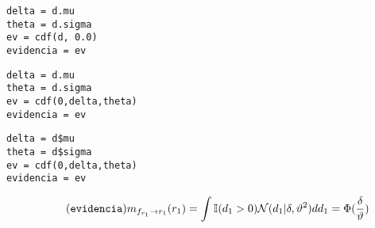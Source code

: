 \documentclass[article]{jss}
\newcommand{\N}{\mathcal{N}}
\begin{document}
\begin{paracol}{3}
\begin{lstlisting}[backgroundcolor=\color{julia}]
delta = d.mu
theta = d.sigma
ev = cdf(d, 0.0)
evidencia = ev
\end{lstlisting}  
 \switchcolumn
\begin{lstlisting}[backgroundcolor=\color{python}]
delta = d.mu
theta = d.sigma
ev = cdf(0,delta,theta) 
evidencia = ev
\end{lstlisting} 
 \switchcolumn
\begin{lstlisting}[backgroundcolor=\color{r}]
delta = d$mu
theta = d$sigma
ev = cdf(0,delta,theta) 
evidencia = ev
\end{lstlisting}   
\end{paracol}
%
\begin{equation}\label{eq:m_fr_r} \tag{\texttt{evidencia}}
\begin{split}
 m_{f_{r_1} \rightarrow r_1}(r_1) = \int \mathbb{I}(d_1 > 0) \N(d_1 | \delta, \vartheta^2)  dd_1 = \Phi(\frac{\delta}{\vartheta})
\end{split}
\end{equation}

\end{document}
